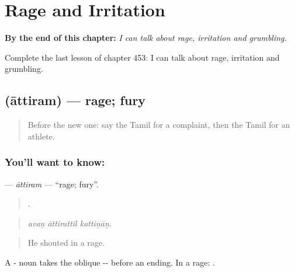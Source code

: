 
\chapter{Rage and Irritation}
\label{ch:ta-rage-and-irritation}

\begin{chapteropening}
\textbf{By the end of this chapter:} \emph{I can talk about rage, irritation and grumbling.}

Complete the last lesson of chapter 453: I can talk about rage, irritation and grumbling.
\end{chapteropening}

\section[\texorpdfstring{\ta{ஆத்திரம்} (āttiram)}{ஆத்திரம் (āttiram)}]{ (āttiram) — rage; fury}

\label{lesson:TA-C453-attiram}



\begin{quote}
Before the new one: say the Tamil for a complaint, then the Tamil for an athlete.
\end{quote}

\subsection*{You'll want to know: }
\textbf{} — \emph{āttiram} — \textquotedblleft{}rage; fury\textquotedblright{}.

\begin{quote}
  .
\end{quote}

\begin{quote}
\emph{avaṉ āttirattil kattiṉāṉ.}
\end{quote}

\begin{quote}
He shouted in a rage.
\end{quote}

A - noun takes the oblique -- before an ending. In a rage: .

